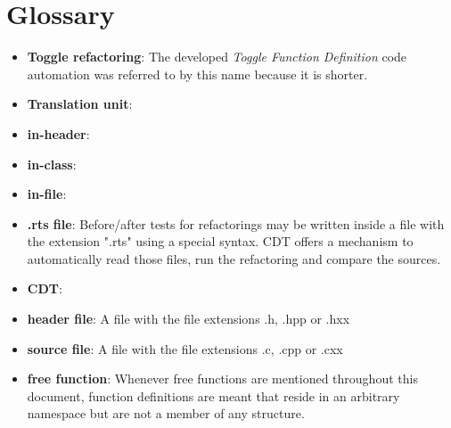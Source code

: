 \chapter{Glossary}
\thispagestyle{fancy}

\begin{itemize}
\item \textbf{Toggle refactoring}: The developed \textit{Toggle Function Definition} code automation was referred to by this name because it is shorter.
\item \textbf{Translation unit}:
\item \textbf{in-header}:
\item \textbf{in-class}:
\item \textbf{in-file}:
\item \textbf{.rts file}: Before/after tests for refactorings may be written 
inside a file with the extension ".rts" using a special syntax. CDT offers a 
mechanism to automatically read those files, run the refactoring and compare the 
sources.
\item \textbf{CDT}:
\item \textbf{header file}: A file with the file extensions .h, .hpp or .hxx
\item \textbf{source file}: A file with the file extensions .c, .cpp or .cxx
\item \textbf{free function}: Whenever free functions are mentioned throughout this document, function definitions are meant that reside in an arbitrary namespace but are not a member of any structure.
\end{itemize}

